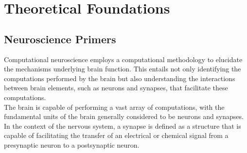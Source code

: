 
\chapter{Theoretical Foundations}  %


\section[Neuroscience Primers]{Neuroscience Primers}

\noindent Computational neuroscience employs a computational methodology to elucidate the mechanisms underlying brain function. This entails not only identifying the computations performed by the brain but also understanding the interactions between brain elements, such as neurons and synapses, that facilitate these computations.\\




\noindent The brain is capable of performing a vast array of computations, with the fundamental units of the brain generally considered to be neurons and synapses. In the context of the nervous system, a synapse is defined as a structure that is capable of facilitating the transfer of an electrical or chemical signal from a presynaptic neuron to a postsynaptic neuron. \\

